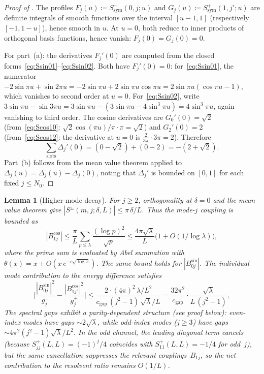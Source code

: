 \documentclass[12pt,a4paper]{article}
\newtheorem{lemma}[theorem]{Lemma}
\theoremstyle{definition}
\theoremstyle{remark}
\begin{document}
\begin{proof}[Proof of ]
The profiles $F_j(u) \coloneqq S^-_{\mathrm{sym}}(0,j;u)$ and $G_j(u) \coloneqq S^+_{\mathrm{sym}}(1,j';u)$ are definite integrals of smooth functions over the interval $[u-1,1]$ (respectively $[-1,1-u]$), hence smooth in $u$. At $u = 0$, both reduce to inner products of orthogonal basis functions, hence vanish: $F_j(0) = G_j(0) = 0$.

For part~(a): the derivatives $F_j'(0)$ are computed from the closed forms~\eqref{eq:Ssin01}--\eqref{eq:Ssin02}. Both have $F_j'(0) = 0$: for~\eqref{eq:Ssin01}, the numerator $-2\sin\pi u + \sin 2\pi u = -2\sin\pi u + 2\sin\pi u\cos\pi u = 2\sin\pi u(\cos\pi u - 1)$, which vanishes to second order at $u = 0$. For~\eqref{eq:Ssin02}, write $3\sin\pi u - \sin 3\pi u = 3\sin\pi u - (3\sin\pi u - 4\sin^3\pi u) = 4\sin^3\pi u$, again vanishing to third order. The cosine derivatives are $G_0'(0) = \sqrt{2}$ (from~\eqref{eq:Scos10}: $\sqrt{2}\cos(\pi u)/\pi \cdot \pi = \sqrt{2}$) and $G_2'(0) = 2$ (from~\eqref{eq:Scos12}: the derivative at $u = 0$ is $\tfrac{2}{3\pi}\cdot 3\pi = 2$). Therefore
\[
  \sum_{\mathrm{slots}} \Delta_j'(0) = (0 - \sqrt{2}) + (0 - 2) = -(2 + \sqrt{2}).
\]
Part~(b) follows from the mean value theorem applied to $\Delta_j(u) = \Delta_j(u) - \Delta_j(0)$, noting that $\Delta_j'$ is bounded on $[0,1]$ for each fixed $j \leq N_0$.
\end{proof}

\begin{lemma}[Higher-mode decay]
\label{lem:higher-mode-decay}
For $j \geq 2$, orthogonality at $\delta = 0$ and the mean value theorem give
$|S^{\pm}(m,j;\delta,L)| \leq \pi\,\delta/L$.
Thus the mode-$j$ coupling is bounded as
\[
  |B_{1j}^{\cos}| \leq \frac{\pi}{L}\sum_{p \leq \lambda}\frac{(\log p)^2}{\sqrt{p}}
  \leq \frac{4\pi\sqrt{\lambda}}{L}\bigl(1 + O(1/\log\lambda)\bigr),
\]
where the prime sum is evaluated by Abel summation with $\theta(x) = x + O(x\,e^{-c\sqrt{\log x}})$. The same bound holds for $|B_{0j}^{\sin}|$. The individual mode contribution to the energy difference satisfies
\[
  \biggl|\frac{|B_{0j}^{\sin}|^2}{g_j^-} - \frac{|B_{1j'}^{\cos}|^2}{g_j^+}\biggr|
  \leq \frac{2 \cdot (4\pi)^2 \,\lambda/L^2}{c_{\mathrm{gap}}\,(j^2-1)\,\sqrt{\lambda}/L}
  = \frac{32\pi^2}{c_{\mathrm{gap}}}\cdot\frac{\sqrt{\lambda}}{L\,(j^2-1)},
\]
The spectral gaps exhibit a \emph{parity-dependent} structure (see proof below): even-index modes have gaps $\sim 2\sqrt{\lambda}$, while odd-index modes ($j \geq 3$) have gaps $\sim 4\pi^2(j^2-1)\sqrt{\lambda}/L^2$. In the odd channel, the leading diagonal term cancels (because $S_{jj}^+(L,L) = (-1)^j/4$ coincides with $S_{11}^+(L,L) = -1/4$ for odd~$j$), but the same cancellation suppresses the relevant couplings~$B_{1j}$, so the net contribution to the resolvent ratio remains $O(1/L)$.
\end{lemma}
\end{document}
